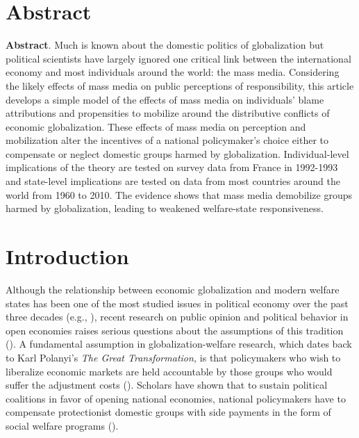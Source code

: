 \documentclass[12pt]{report}
\begin{document}
\section{Abstract}

\textbf{Abstract}. Much is known about the domestic politics of globalization but political scientists
have largely ignored one critical link between the international economy and most individuals around
the world: the mass media. Considering the likely effects of mass media on public perceptions of
responsibility, this article develops a simple model of the effects of mass media on individuals'
blame attributions and propensities to mobilize around the distributive conflicts of economic
globalization. These effects of mass media on perception and mobilization alter the incentives of a
national policymaker's choice either to compensate or neglect domestic groups harmed by
globalization. Individual-level implications of the theory are tested on survey data from France in
1992-1993 and state-level implications are tested on data from most countries around the world from
1960 to 2010. The evidence shows that mass media demobilize groups harmed by globalization, leading
to weakened welfare-state responsiveness.

\section{Introduction}

Although the relationship between economic globalization and modern welfare states has been one of
the most studied issues in political economy over the past three decades (e.g., \citealt[316]{Gourevitch:1978bn,Garrett:1995tj,Rodrik:1998te,Burgoon:2001dp,Adsera:2002vt,Oatley:2011hv}), recent
research on public opinion and political behavior in open economies raises serious questions about
the assumptions of this tradition (\citealt[155]{Hellwig:2007wt}). A fundamental assumption in
globalization-welfare research, which dates back to Karl Polanyi's \emph{The Great Transformation,}
is that policymakers who wish to liberalize economic markets are held accountable by those groups
who would suffer the adjustment costs (\citealt{Polanyi:2001vc,Ruggie:1982wx}). Scholars have shown
that to sustain political coalitions in favor of opening national economies, national policymakers
have to compensate protectionist domestic groups with side payments in the form of social welfare
programs (\citealt[1028-29]{Katzenstein:1985ub,Rodrik:1998te,Adsera:2002vt}).
\end{document}

